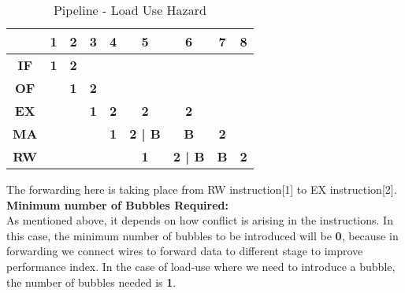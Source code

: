 \documentclass[12pt]{article}
\begin{document}
\begin{table}[]
\begin{center}
\begin{tabular}{|c|ccccccll}
\hline
\multicolumn{1}{|l|}{} & \multicolumn{1}{c|}{1}          & \multicolumn{1}{c|}{\textbf{2}} & \multicolumn{1}{c|}{\textbf{3}} & \multicolumn{1}{c|}{\textbf{4}} & \multicolumn{1}{c|}{\textbf{5}}     & \multicolumn{1}{c|}{\textbf{6}}     & \multicolumn{1}{c|}{\textbf{7}} & \multicolumn{1}{c|}{\textbf{8}} \\ \hline
\textbf{IF}            & \multicolumn{1}{c|}{\textbf{1}} & \multicolumn{1}{c|}{\textbf{2}} &                                 & \multicolumn{1}{l}{}            & \multicolumn{1}{l}{}                & \multicolumn{1}{l}{}                &                                 &                                 \\ \cline{1-4}
\textbf{OF}            & \multicolumn{1}{c|}{}           & \multicolumn{1}{c|}{\textbf{1}} & \multicolumn{1}{c|}{\textbf{2}} & \textbf{}                       & \textbf{}                           & \textbf{}                           &                                 &                                 \\ \cline{1-1} \cline{3-7}
\textbf{EX}            &                                 & \multicolumn{1}{c|}{}           & \multicolumn{1}{c|}{\textbf{1}} & \multicolumn{1}{c|}{\textbf{2}} & \multicolumn{1}{c|}{\textbf{2}}     & \multicolumn{1}{c|}{\textbf{2}}     &                                 &                                 \\ \cline{1-1} \cline{4-8}
\textbf{MA}            &                                 &                                 & \multicolumn{1}{c|}{}           & \multicolumn{1}{c|}{\textbf{1}} & \multicolumn{1}{c|}{\textbf{2 | B}} & \multicolumn{1}{c|}{\textbf{B}}     & \multicolumn{1}{c|}{\textbf{2}} &                                 \\ \cline{1-1} \cline{5-9} 
\textbf{RW}            &                                 &                                 &                                 & \multicolumn{1}{l|}{}           & \multicolumn{1}{c|}{\textbf{1}}     & \multicolumn{1}{c|}{\textbf{2 | B}} & \multicolumn{1}{l|}{\textbf{B}}          & \multicolumn{1}{c|}{\textbf{2}} \\ \cline{1-1} \cline{6-9} 
\end{tabular}
    \end{center}
    \caption{Pipeline - Load Use Hazard}
\end{table}

The forwarding here is taking place from RW instruction[1] to EX instruction[2]. \\

\textbf{Minimum number of Bubbles Required:} \\
As mentioned above, it depends on how conflict is arising in the instructions. In this case, the minimum number of bubbles to be introduced will be \textbf{0}, because in forwarding we connect wires to forward data to different stage to improve performance index. In the case of load-use where we need to introduce a bubble, the number of bubbles needed is \textbf{1}.

\end{document}
